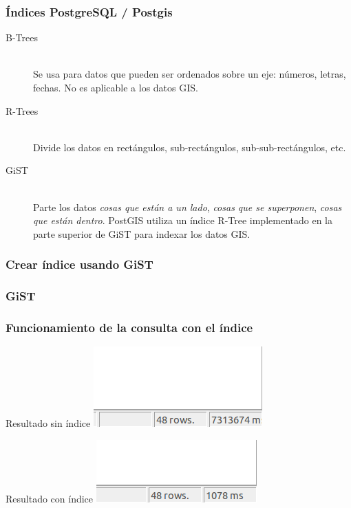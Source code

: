 \documentclass{classes/beamer_GeomaticaUA}
\begin{document}
\begin{frame}[fragile]
\frametitle{Índices PostgreSQL / Postgis}
\begin{description}
\item[B-Trees]\hfill \\ Se usa para datos que pueden ser ordenados sobre un eje: números, letras, fechas. No es aplicable a los datos GIS.
\item[R-Trees] \hfill \\Divide los datos en rectángulos, sub-rectángulos, sub-sub-rectángulos, etc.
\item[GiST] \hfill \\Parte los datos \emph{cosas que están a un lado}, \emph{cosas que se superponen}, \emph{cosas que están dentro}. PostGIS utiliza un índice R-Tree implementado en la parte superior de GiST para indexar los datos GIS.
\end{description}
\end{frame}
\begin{frame}[fragile]
\frametitle{Crear índice usando GiST}

\end{frame}
\begin{frame}[fragile]
\frametitle{GiST}

\end{frame}
\begin{frame}[fragile]
\frametitle{Funcionamiento de la consulta con el índice}
\begin{block}{Resultado sin índice}
\center\includegraphics[scale=0.5]{images/resultWithoutIndex.png}
\end{block}
\begin{block}{Resultado con índice}
\center\includegraphics[scale=0.5]{images/resultWithIndex.png}
\end{block}
\end{frame}
\end{document}
